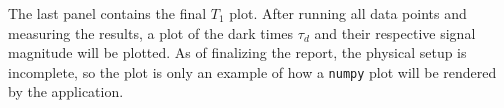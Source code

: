The last panel contains the final $T_1$ plot. After running all data points and measuring the results, a plot of the dark times $\tau_d$ and their respective signal magnitude will be plotted. As of finalizing the report, the physical setup is incomplete, so the plot is only an example of how a \lstinline|numpy| plot will be rendered by the application.


%
%		
%		
%		
%


